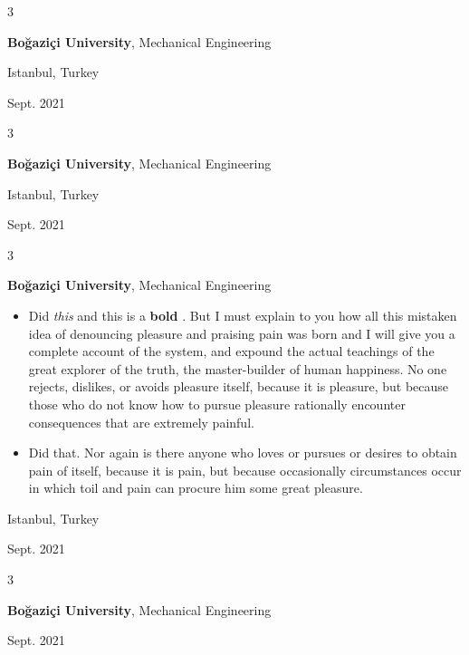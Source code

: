 \documentclass[10pt, letterpaper]{article}
\newenvironment{highlights}{
    \begin{itemize}[
        topsep=0.10 cm,
        parsep=0.10 cm,
        partopsep=0pt,
        itemsep=0pt,
        leftmargin=0.4 cm + 10pt
    ]
}{
    \end{itemize}
} %
\newenvironment{threecolentry}[3][]{
    \onecolentry
    \def\thirdColumn{#3}
    \setcolumnwidth{1 cm, \fill, 4.5 cm}
    \begin{paracol}{3}
    {\raggedright #2} \switchcolumn
}{
    \switchcolumn \raggedleft \thirdColumn
    \end{paracol}
    \endonecolentry
} %
\let\hrefWithoutArrow\href
\renewcommand{\href}[2]{\hrefWithoutArrow{#1}{\mbox{\ifthenelse{\equal{#2}{}}{ }{#2 }\raisebox{.15ex}{\footnotesize \faExternalLink*}}}}
\begin{document}
        \vspace{0.2 cm}

        \begin{threecolentry}{\textbf{}}{
            Istanbul, Turkey

        Sept. 2021
        }
            \textbf{Boğaziçi University}, Mechanical Engineering
        \end{threecolentry}

        \vspace{0.2 cm}

        \begin{threecolentry}{\textbf{}}{
            Istanbul, Turkey

        Sept. 2021
        }
            \textbf{Boğaziçi University}, Mechanical Engineering
        \end{threecolentry}

        \vspace{0.2 cm}

        \begin{threecolentry}{\textbf{}}{
            Istanbul, Turkey

        Sept. 2021
        }
            \textbf{Boğaziçi University}, Mechanical Engineering
            \begin{highlights}
                \item Did \textit{this} and this is a \textbf{bold} \href{https://example.com}{link}. But I must explain to you how all this mistaken idea of denouncing pleasure and praising pain was born and I will give you a complete account of the system, and expound the actual teachings of the great explorer of the truth, the master-builder of human happiness. No one rejects, dislikes, or avoids pleasure itself, because it is pleasure, but because those who do not know how to pursue pleasure rationally encounter consequences that are extremely painful.
                \item Did that. Nor again is there anyone who loves or pursues or desires to obtain pain of itself, because it is pain, but because occasionally circumstances occur in which toil and pain can procure him some great pleasure.
            \end{highlights}
        \end{threecolentry}

        \vspace{0.2 cm}

        \begin{threecolentry}{\textbf{}}{
            Sept. 2021
        }
            \textbf{Boğaziçi University}, Mechanical Engineering
        \end{threecolentry}
\end{document}
